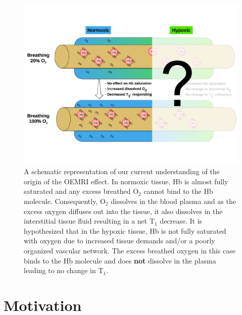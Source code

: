 \begin{figure}
	\begin{center}
	\includegraphics[width=\textwidth]{./oemri_thesis1/oemri_thesis1-images/oemriDark.pdf}
	\caption{A schematic representation of our current understanding of the origin of the OEMRI effect. In normoxic tissue, \acs{Hb} is almost fully saturated and any excess breathed O$_2$ cannot bind to the \acs{Hb} molecule. Consequently, O$_2$ dissolves in the blood plasma and as the excess oxygen diffuses out into the tissue, it also dissolves in the interstitial tissue fluid resulting in a net T$_1$ decrease. It is hypothesized that in the hypoxic tissue, \acs{Hb} is not fully saturated with oxygen due to increased tissue demands and/or a poorly organized vascular network. The excess breathed oxygen in this case binds to the \acs{Hb} molecule and does \textbf{not} dissolve in the plasma leading to no change in T$_1$.}
	\label{oemri}
	\end{center}
\end{figure}

\section{Motivation}

